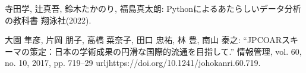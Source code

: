 \documentclass[submit,noauthor]{ono}
\begin{document}
\begin{thebibliography}{}
	
	
寺田学, 辻真吾, 鈴木たかのり, 福島真太朗:
Pythonによるあたらしいデータ分析の教科書
翔泳社(2022).

大園 隼彦, 片岡 朋子, 高橋 菜奈子, 田口 忠祐, 林 豊, 南山 泰之:
“JPCOARスキーマの策定：日本の学術成果の円滑な国際的流通を目指して.”
情報管理, vol. 60, no. 10, 2017, pp. 719–29
urlj{https://doi.org/10.1241/johokanri.60.719.}

‌
	
	
	
	
	
	
\end{thebibliography}
	
\onecolumn
\end{document}
